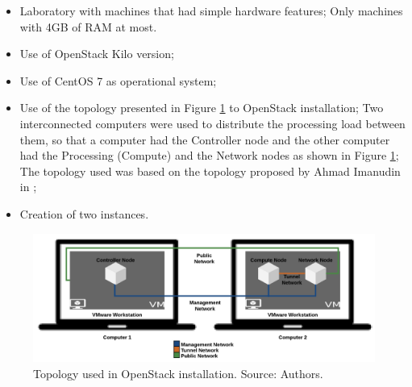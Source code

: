 \documentclass[conference]{IEEEtran}
\begin{document}
	
	\begin{itemize}
	 \item Laboratory with machines that had simple hardware features;
	    \subitem Only machines with 4GB of RAM at most.
	 \item Use of OpenStack Kilo version;
	 \item Use of CentOS 7 \cite{centos} as operational system;
	 \item Use of the topology presented in Figure \ref{fig:topologia} to OpenStack installation;
	    \subitem Two interconnected computers were used to distribute the processing load between them,
		     so that a computer had the Controller node and the other computer had the Processing (Compute) and the Network
		     nodes as shown in Figure \ref{fig:topologia};
	    \subitem The topology used was based on the topology proposed by Ahmad Imanudin in \cite{imanudin};
	  \item Creation of two instances.
	\end{itemize}
	
	\begin{figure}[ht]
	\centering
	\includegraphics[width=.5\textwidth]{figuras/topologia.png}
	\caption{Topology used in OpenStack installation. Source: Authors.}
	\label{fig:topologia}
	\end{figure}
	
\end{document}
